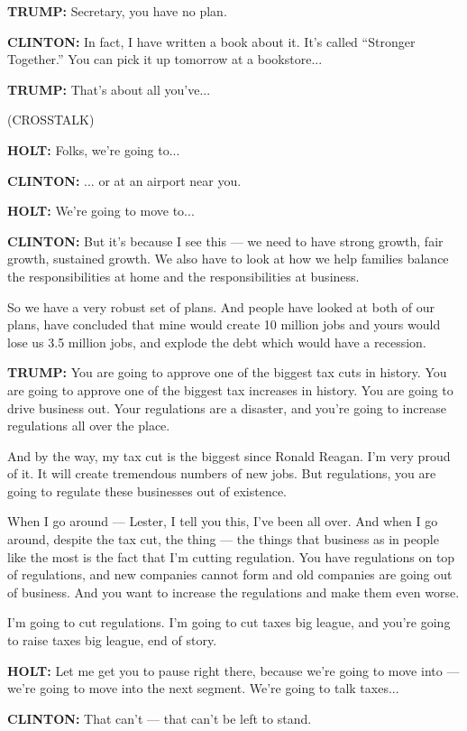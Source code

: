 \textbf{TRUMP:} Secretary, you have no plan.

\textbf{CLINTON:} In fact, I have written a book about it. It's called
``Stronger Together.'' You can pick it up tomorrow at a bookstore...

\textbf{TRUMP:} That's about all you've...

(CROSSTALK)

\textbf{HOLT:} Folks, we're going to...

\textbf{CLINTON:} ... or at an airport near you.

\textbf{HOLT:} We're going to move to...

\textbf{CLINTON:} But it's because I see this --- we need to have strong
growth, fair growth, sustained growth. We also have to look at how we
help families balance the responsibilities at home and the
responsibilities at business.

So we have a very robust set of plans. And people have looked at both of
our plans, have concluded that mine would create 10 million jobs and
yours would lose us 3.5 million jobs, and explode the debt which would
have a recession.

\textbf{TRUMP:} You are going to approve one of the biggest tax cuts in
history. You are going to approve one of the biggest tax increases in
history. You are going to drive business out. Your regulations are a
disaster, and you're going to increase regulations all over the place.

And by the way, my tax cut is the biggest since Ronald Reagan. I'm very
proud of it. It will create tremendous numbers of new jobs. But
regulations, you are going to regulate these businesses out of
existence.

When I go around --- Lester, I tell you this, I've been all over. And
when I go around, despite the tax cut, the thing --- the things that
business as in people like the most is the fact that I'm cutting
regulation. You have regulations on top of regulations, and new
companies cannot form and old companies are going out of business. And
you want to increase the regulations and make them even worse.

I'm going to cut regulations. I'm going to cut taxes big league, and
you're going to raise taxes big league, end of story.

\textbf{HOLT:} Let me get you to pause right there, because we're going
to move into --- we're going to move into the next segment. We're going
to talk taxes...

\textbf{CLINTON:} That can't --- that can't be left to stand.


